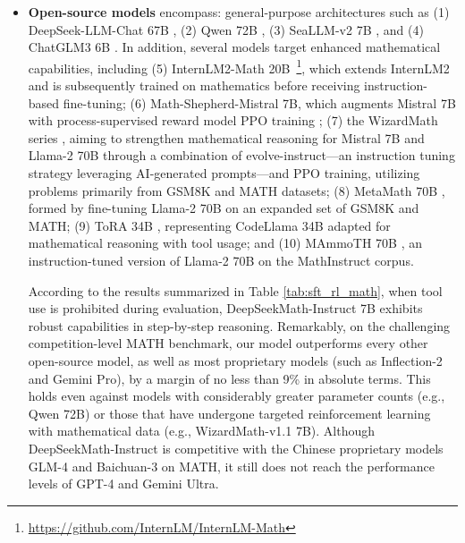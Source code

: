 \begin{itemize}[topsep=0pt]
\begin{itemize}[topsep=0pt]
    \item \textbf{Closed-source models} encompass: (1) the GPT series, with GPT-4 \citep{gpt4} and its Code Interpreter variant~\footnote{\url{https://openai.com/blog/chatgpt-plugins\#\#code-interpreter}} being the most advanced representatives, (2) Gemini Ultra and Pro \citep{gemini}, (3) Inflection-2 \citep{inflection-2}, (4) Grok-1~\footnote{\url{https://x.ai/model-card}}, in addition to models that have been introduced more recently by Chinese technology firms such as (5) Baichuan-3~\footnote{\url{https://www.baichuan-ai.com}}, and (6) the latest iteration of the GLM family, GLM-4~\footnote{\url{https://open.bigmodel.cn/dev/api\#glm-4}} \citep{glm}.
\end{itemize}

These models are designed for broad applications, and the majority have been subjected to various alignment techniques.
    \item \textbf{Open-source models} encompass: general-purpose architectures such as (1) DeepSeek-LLM-Chat 67B \citep{deepseek-llm}, (2) Qwen 72B \citep{qwen}, (3) SeaLLM-v2 7B \citep{seallm}, and (4) ChatGLM3 6B \citep{chatglm3}. In addition, several models target enhanced mathematical capabilities, including (5) InternLM2-Math 20B~\footnote{\url{https://github.com/InternLM/InternLM-Math}}, which extends InternLM2 and is subsequently trained on mathematics before receiving instruction-based fine-tuning; (6) Math-Shepherd-Mistral 7B, which augments Mistral 7B \citep{mistral} with process-supervised reward model PPO training \citep{schulman2017proximal}; (7) the WizardMath series \citep{wizardmath}, aiming to strengthen mathematical reasoning for Mistral 7B and Llama-2 70B \citep{llama2} through a combination of evolve-instruct—an instruction tuning strategy leveraging AI-generated prompts—and PPO training, utilizing problems primarily from GSM8K and MATH datasets; (8) MetaMath 70B \citep{metamath}, formed by fine-tuning Llama-2 70B on an expanded set of GSM8K and MATH; (9) ToRA 34B \cite{tora}, representing CodeLlama 34B adapted for mathematical reasoning with tool usage; and (10) MAmmoTH 70B \citep{MathInstruct}, an instruction-tuned version of Llama-2 70B on the MathInstruct corpus.

According to the results summarized in Table \ref{tab:sft_rl_math}, when tool use is prohibited during evaluation, DeepSeekMath-Instruct 7B exhibits robust capabilities in step-by-step reasoning. Remarkably, on the challenging competition-level MATH benchmark, our model outperforms every other open-source model, as well as most proprietary models (such as Inflection-2 and Gemini Pro), by a margin of no less than 9\% in absolute terms. This holds even against models with considerably greater parameter counts (e.g., Qwen 72B) or those that have undergone targeted reinforcement learning with mathematical data (e.g., WizardMath-v1.1 7B). Although DeepSeekMath-Instruct is competitive with the Chinese proprietary models GLM-4 and Baichuan-3 on MATH, it still does not reach the performance levels of GPT-4 and Gemini Ultra.


\end{itemize}
